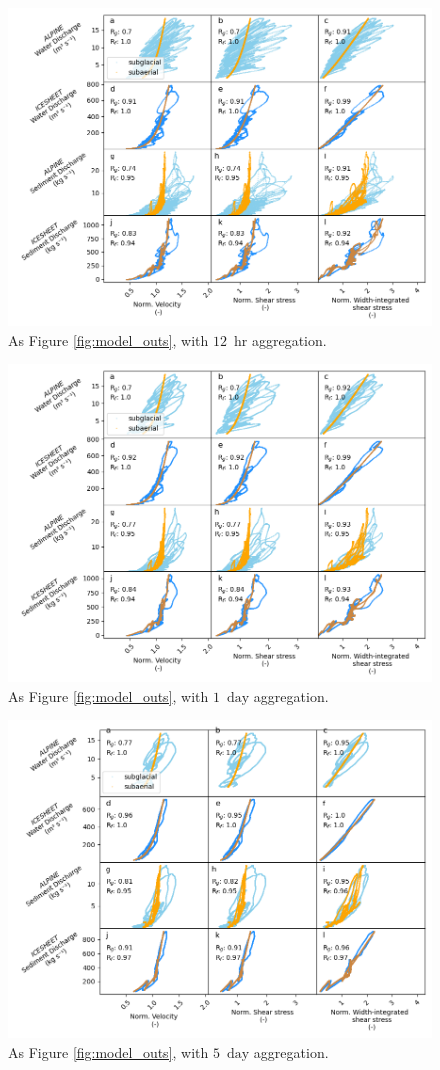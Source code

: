 \documentclass[draft]{agujournal2019}
\newcommand{\unit}[1]{$\mathrm{#1}$}
\begin{document}
\begin{center}
  \begin{figure}[h]
    \includegraphics[width=0.7\linewidth]{Fig3_12hr.png}
    \caption{As Figure \ref{fig:model_outs}, with $12$ \,\unit{hr} aggregation.}
    \label{fig:model_outs_12hr}
  \end{figure}
\end{center}


\begin{center}
  \begin{figure}[h]
    \includegraphics[width=0.7\linewidth]{Fig3_1day.png}
    \caption{As Figure \ref{fig:model_outs}, with $1$ \,\unit{day} aggregation.}
    \label{fig:model_outs_1day}
  \end{figure}
\end{center}


\begin{center}
  \begin{figure}[h]
    \includegraphics[width=0.7\linewidth]{Fig3_5day.png}
    \caption{As Figure \ref{fig:model_outs}, with $5$ \,\unit{day} aggregation.}
    \label{fig:model_outs_5day}
  \end{figure}
\end{center}
\end{document}

